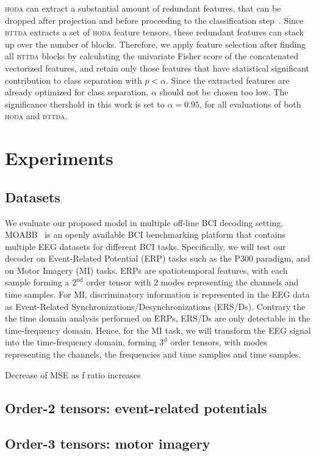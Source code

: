 \documentclass[twocolumn]{article}
\begin{document}
\textsc{hoda} can extract a substantial amount of redundant features, that can
be dropped after projection and before proceeding to the classification
step~\cite{Phan2010}.
Since \textsc{bttda} extracts a set of \textsc{hoda}
feature tensors, these redundant features can stack up over the number of
blocks.
Therefore, we apply feature selection after finding all \textsc{bttda} blocks
by calculating the univariate Fisher score of the concatenated vectorized
features, and retain only those features that have  statistical significant
contribution to class separation with $p<\alpha$.
Since the extracted features are already optimized for class separation,
$\alpha$ should not be chosen too low.
The significance thershold in this work is set to $\alpha=0.95$, for all
evaluations of both \textsc{hoda} and \textsc{bttda}.


\section{Experiments}
\subsection{Datasets}
We evaluate our proposed model in multiple off-line BCI decoding setting.
MOABB~\cite{Aristimunha2023} is an openly available BCI benchmarking platform that contains
multiple EEG datasets for different BCI tasks.
Specifically, we will test our decoder on Event-Related Potential (ERP) tasks
such as the P300 paradigm, and on Motor Imagery (MI) tasks.
ERPs are spatiotemporal features, with each sample forming a $2^\text{nd}$
order tensor with 2 modes representing the channels and time samples.
For MI, discriminatory information is represented in the EEG data as
Event-Related Synchronizations/Desynchronizations (ERS/Ds).
Contrary the the time domain analysis performed on ERPs, ERS/Ds are only
detectable in the time-frequency domain.
Hence, for the MI task, we will transform the EEG signal into the
time-frequency domain, forming $3^\text{d}$ order tensors, with modes
representing the channels, the frequencies and time samplies and time samples.

Decrease of MSE as f ratio increases
\subsection{Order-2 tensors: event-related potentials}


\subsection{Order-3 tensors: motor imagery}
\end{document}
